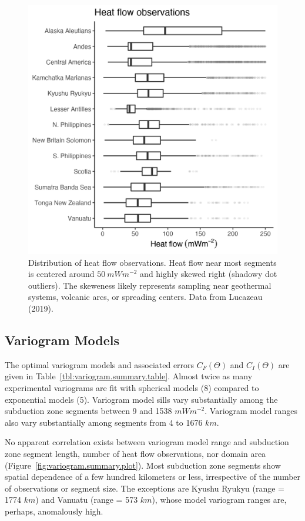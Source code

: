 \documentclass[draft,linenumbers]{agujournal2018}
\begin{document}
\begin{figure}[h]

{\centering \includegraphics[width=0.6\linewidth,]{../figs/summary/hf_summary} 

}

\caption{Distribution of heat flow observations. Heat flow near most segments is centered around $50~mWm^{-2}$ and highly skewed right (shadowy dot outliers). The skeweness likely represents sampling near geothermal systems, volcanic arcs, or spreading centers. Data from Lucazeau (2019).}\label{fig:hf.summary.plot}
\end{figure}

\subsection{Variogram Models}

The optimal variogram models and associated errors \(C_F(\Theta)\) and
\(C_I(\Theta)\) are given in Table~\ref{tbl:variogram.summary.table}.
Almost twice as many experimental variograms are fit with spherical
models (8) compared to exponential models (5). Variogram model sills
vary substantially among the subduction zone segments between 9 and 1538
\(mWm^{-2}\). Variogram model ranges also vary substantially among
segments from 4 to 1676 \(km\).

No apparent correlation exists between variogram model range and
subduction zone segment length, number of heat flow observations, nor
domain area (Figure~\ref{fig:variogram.summary.plot}). Most subduction
zone segments show spatial dependence of a few hundred kilometers or
less, irrespective of the number of observations or segment size. The
exceptions are Kyushu Ryukyu (range = 1774 \(km\)) and Vanuatu (range =
573 \(km\)), whose model variogram ranges are, perhaps, anomalously
high.
\end{document}
